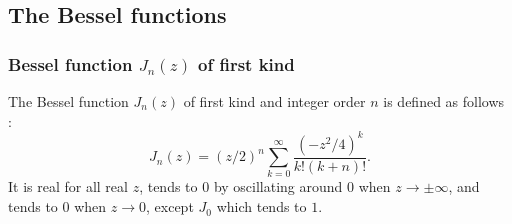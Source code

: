 \documentclass[12pt]{amsart}
\begin{document}
\subsection{The Bessel functions}


\subsubsection{Bessel function $J_n(z)$ of first kind}

The Bessel function $J_n(z)$ of first kind and integer order $n$
is defined as follows \cite[Eq.~(9.1.10)]{AbSt73}:
\begin{equation} \label{Jn_0}
J_n(z) = (z/2)^n \sum_{k=0}^{\infty} \frac{(-z^2/4)^k}{k! (k+n)!}.
\end{equation}
It is real for all real $z$, tends to $0$ by oscillating around $0$ when
$z \rightarrow \pm\infty$, and tends to $0$ when $z \rightarrow 0$, except
$J_0$ which tends to $1$.
\end{document}
